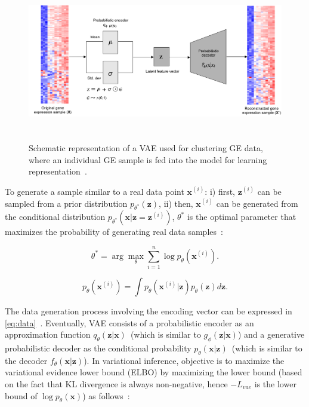 \begin{figure}[h]
	\centering
	\includegraphics[width=\textwidth,height=70mm]{images/vae.png}	
	\caption{Schematic representation of a VAE used for clustering GE data, where an individual GE sample is fed into the model for learning representation~\cite{karimBIB2019}.}	
	\label{fig:vae}
	\vspace{-4mm} 
\end{figure}

\hspace*{3.5mm} To generate a sample similar to a real data point $\mathbf{x}^{(i)}$: i) first, $\mathbf{z}^{(i)}$ can be sampled from a prior distribution $p_{\theta^{*}}(\mathbf{z})$, ii) then,  $\mathbf{x}^{(i)}$ can be generated from the conditional distribution $p_{\theta^{*}}\left(\mathbf{x} | \mathbf{z}=\mathbf{z}^{(i)}\right)$, $\theta^{*}$ is the optimal parameter that maximizes the probability of generating real data samples~\cite{VADE}:

\begin{equation}
    \theta^{*}=\arg \max _{\theta} \sum_{i=1}^{n} \log p_{\theta}\left(\mathbf{x}^{(i)}\right).
\end{equation}

\begin{equation}
    p_{\theta}\left(\mathbf{x}^{(i)}\right)=\int p_{\theta}\left(\mathbf{x}^{(i)} | \mathbf{z}\right) p_{\theta}(\mathbf{z}) d \mathbf{z}.
    \label{eq:data}
\end{equation}

\hspace*{3.5mm} The data generation process involving the encoding vector can be expressed in \cref{eq:data}~\cite{VADE}. Eventually, VAE consists of a probabilistic encoder as an approximation function $q_{\theta}(\mathbf{z} | \mathbf{x})$~(which is similar to $g_{\phi}(\mathbf{z} | \mathbf{x})$) and a generative probabilistic decoder as the conditional probability $p_{\theta}(\mathbf{x}|\mathbf{z})$~(which is similar to the decoder $f_{\theta}(\mathbf{x}|\mathbf{z})$). In variational inference, objective is to maximize the variational evidence lower bound (ELBO) by maximizing the lower bound (based on the fact that KL divergence is always non-negative, hence $-L_{vae}$ is the lower bound of $\log p_{\theta}(\mathbf{x})$) as follows~\cite{VADE}: 

